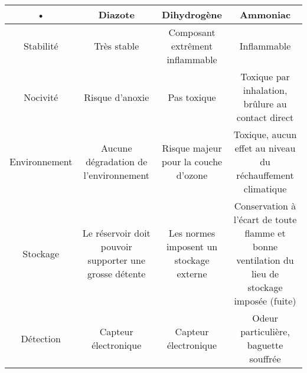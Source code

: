 

\begin{tabular}{|c|c|c|c|}
\hline 
• & Diazote & Dihydrogène & Ammoniac \\ 
\hline 
Stabilité & Très stable & Composant extrêment inflammable & Inflammable \\ 
\hline 
Nocivité & Risque d'anoxie & Pas toxique & Toxique par inhalation, brûlure au contact direct \\ 
\hline 
Environnement & Aucune dégradation de l'environnement & Risque majeur pour la couche d'ozone & Toxique, aucun effet au niveau du réchauffement climatique \\ 
\hline 
Stockage & Le réservoir doit pouvoir supporter une grosse détente & Les normes imposent un stockage externe & Conservation à l'écart de toute flamme et bonne ventilation du lieu de stockage imposée (fuite) \\ 
\hline 
Détection & Capteur électronique & Capteur électronique & Odeur particulière, baguette souffrée \\ 
\hline 
\end{tabular} 
